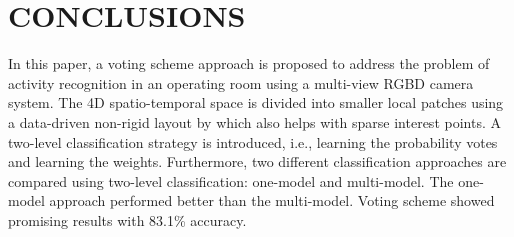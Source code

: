 \documentclass[a4paper, 10pt, conference]{ieeeconf}      %
\begin{document}

\section{CONCLUSIONS}
\label{section:conclusionsAndFutureWorks}


	In this paper, a voting scheme approach is proposed to address the problem of activity recognition in an operating room using a multi-view RGBD camera system. The 4D spatio-temporal space is divided into smaller local patches using a data-driven non-rigid layout by \cite{c1} which also helps with sparse interest points. A two-level classification strategy is introduced, i.e., learning the probability votes and learning the weights. Furthermore, two different classification approaches are compared using two-level classification: one-model and multi-model. The one-model approach performed better than the multi-model. Voting scheme showed promising results with 83.1\% accuracy.
    
\end{document}
